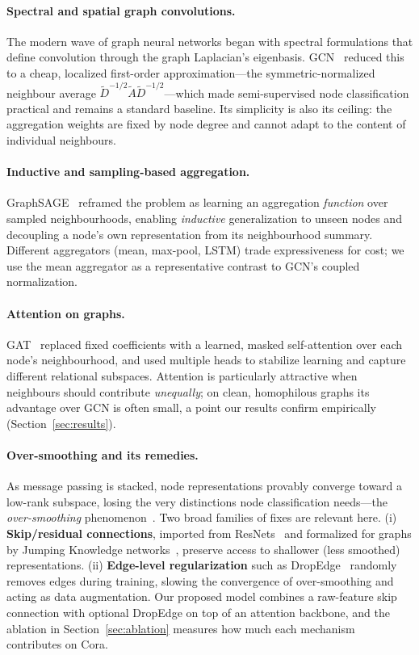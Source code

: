 \documentclass{article}
\begin{document}
\paragraph{Spectral and spatial graph convolutions.}
The modern wave of graph neural networks began with spectral formulations that define
convolution through the graph Laplacian's eigenbasis. GCN~\cite{kipf2017gcn} reduced
this to a cheap, localized first-order approximation---the symmetric-normalized
neighbour average $\tilde{D}^{-1/2}\tilde{A}\tilde{D}^{-1/2}$---which made
semi-supervised node classification practical and remains a standard baseline. Its
simplicity is also its ceiling: the aggregation weights are fixed by node degree and
cannot adapt to the content of individual neighbours.

\paragraph{Inductive and sampling-based aggregation.}
GraphSAGE~\cite{hamilton2017graphsage} reframed the problem as learning an aggregation
\emph{function} over sampled neighbourhoods, enabling \emph{inductive} generalization
to unseen nodes and decoupling a node's own representation from its neighbourhood
summary. Different aggregators (mean, max-pool, LSTM) trade expressiveness for cost; we
use the mean aggregator as a representative contrast to GCN's coupled normalization.

\paragraph{Attention on graphs.}
GAT~\cite{velickovic2018gat} replaced fixed coefficients with a learned,
masked self-attention over each node's neighbourhood, and used multiple heads to
stabilize learning and capture different relational subspaces. Attention is
particularly attractive when neighbours should contribute \emph{unequally}; on clean,
homophilous graphs its advantage over GCN is often small, a point our results confirm
empirically (Section~\ref{sec:results}).

\paragraph{Over-smoothing and its remedies.}
As message passing is stacked, node representations provably converge toward a
low-rank subspace, losing the very distinctions node classification needs---the
\emph{over-smoothing} phenomenon~\cite{li2018deeper,oono2020oversmoothing}. Two broad
families of fixes are relevant here. (i) \textbf{Skip/residual connections}, imported
from ResNets~\cite{he2016resnet} and formalized for graphs by Jumping Knowledge
networks~\cite{xu2018jknet}, preserve access to shallower (less smoothed)
representations. (ii) \textbf{Edge-level regularization} such as
DropEdge~\cite{rong2020dropedge} randomly removes edges during training, slowing the
convergence of over-smoothing and acting as data augmentation. Our proposed model
combines a raw-feature skip connection with optional DropEdge on top of an attention
backbone, and the ablation in Section~\ref{sec:ablation} measures how much each
mechanism contributes on Cora.
\end{document}
